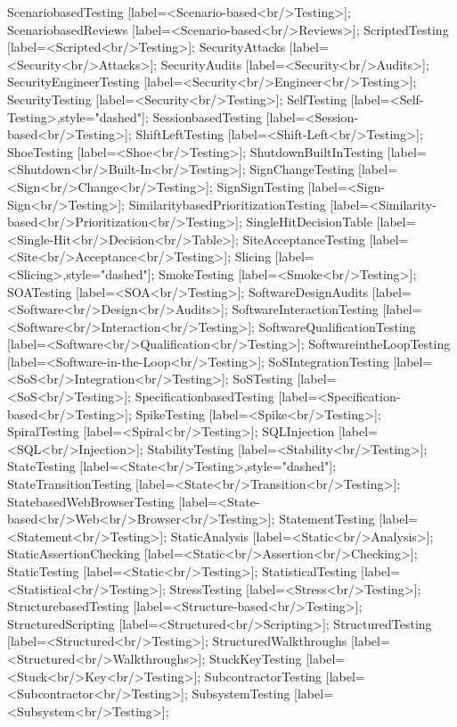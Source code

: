 \documentclass{article}
\begin{document}
{ScenariobasedTesting [label=<Scenario-based<br/>Testing>];
ScenariobasedReviews [label=<Scenario-based<br/>Reviews>];
ScriptedTesting [label=<Scripted<br/>Testing>];
SecurityAttacks [label=<Security<br/>Attacks>];
SecurityAudits [label=<Security<br/>Audits>];
SecurityEngineerTesting [label=<Security<br/>Engineer<br/>Testing>];
SecurityTesting [label=<Security<br/>Testing>];
SelfTesting [label=<Self-Testing>,style="dashed"];
SessionbasedTesting [label=<Session-based<br/>Testing>];
ShiftLeftTesting [label=<Shift-Left<br/>Testing>];
ShoeTesting [label=<Shoe<br/>Testing>];
ShutdownBuiltInTesting [label=<Shutdown<br/>Built-In<br/>Testing>];
SignChangeTesting [label=<Sign<br/>Change<br/>Testing>];
SignSignTesting [label=<Sign-Sign<br/>Testing>];
SimilaritybasedPrioritizationTesting [label=<Similarity-based<br/>Prioritization<br/>Testing>];
SingleHitDecisionTable [label=<Single-Hit<br/>Decision<br/>Table>];
SiteAcceptanceTesting [label=<Site<br/>Acceptance<br/>Testing>];
Slicing [label=<Slicing>,style="dashed"];
SmokeTesting [label=<Smoke<br/>Testing>];
SOATesting [label=<SOA<br/>Testing>];
SoftwareDesignAudits [label=<Software<br/>Design<br/>Audits>];
SoftwareInteractionTesting [label=<Software<br/>Interaction<br/>Testing>];
SoftwareQualificationTesting [label=<Software<br/>Qualification<br/>Testing>];
SoftwareintheLoopTesting [label=<Software-in-the-Loop<br/>Testing>];
SoSIntegrationTesting [label=<SoS<br/>Integration<br/>Testing>];
SoSTesting [label=<SoS<br/>Testing>];
SpecificationbasedTesting [label=<Specification-based<br/>Testing>];
SpikeTesting [label=<Spike<br/>Testing>];
SpiralTesting [label=<Spiral<br/>Testing>];
SQLInjection [label=<SQL<br/>Injection>];
StabilityTesting [label=<Stability<br/>Testing>];
StateTesting [label=<State<br/>Testing>,style="dashed"];
StateTransitionTesting [label=<State<br/>Transition<br/>Testing>];
StatebasedWebBrowserTesting [label=<State-based<br/>Web<br/>Browser<br/>Testing>];
StatementTesting [label=<Statement<br/>Testing>];
StaticAnalysis [label=<Static<br/>Analysis>];
StaticAssertionChecking [label=<Static<br/>Assertion<br/>Checking>];
StaticTesting [label=<Static<br/>Testing>];
StatisticalTesting [label=<Statistical<br/>Testing>];
StressTesting [label=<Stress<br/>Testing>];
StructurebasedTesting [label=<Structure-based<br/>Testing>];
StructuredScripting [label=<Structured<br/>Scripting>];
StructuredTesting [label=<Structured<br/>Testing>];
StructuredWalkthroughs [label=<Structured<br/>Walkthroughs>];
StuckKeyTesting [label=<Stuck<br/>Key<br/>Testing>];
SubcontractorTesting [label=<Subcontractor<br/>Testing>];
SubsystemTesting [label=<Subsystem<br/>Testing>];
}
\end{document}
